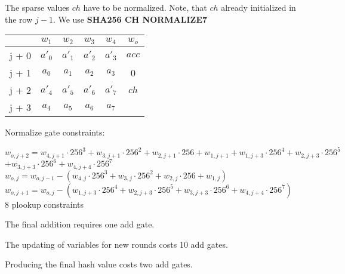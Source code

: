 The sparse values $ch$ have to be normalized.
Note, that $ch$ already initialized in the row $j - 1$.
We use \textbf{SHA256 CH NORMALIZE7}
\begin{center}
\begin{tabular}{ c|c|c|c|c|c } 
  & $w_1$ & $w_2$ & $w_3$ & $w_4$ & $w_o$\\ 
 \hline
j + 0 & $a'_0$ & $a'_1$ & $a'_2$ & $a'_3$ &  $acc$\\ 
j + 1 & $a_0$ & $ a_1$ & $a_2$ & $a_3$ & 0\\
j + 2 & $a'_4$ & $a'_5$ & $a'_6$ & $a'_7$ & $ch$ \\ 
j + 3 & $a_4$ & $ a_5$ & $a_6$ & $a_7$ &  \\
\end{tabular}
\end{center}

Normalize gate constraints:
\begin{center}
$w_{o,j+2} = w_{4,j+1} \cdot 256^3 + w_{3,j+1} \cdot 256^2 + w_{2,j+1} \cdot 256 + w_{1,j+1}
	+  w_{1,j+3} \cdot 256^4 + w_{2,j+3} \cdot 256^5$ \\
	$+ w_{3,j+3} \cdot 256^6 + w_{4,j+4} \cdot 256^7$ \\
$w_{o,j} = w_{o, j - 1} - (w_{4,j} \cdot 256^3 + w_{3,j} \cdot 256^2 + w_{2,j} \cdot 256 + w_{1,j})$ \\
$w_{o,j+1} = w_{o,j} - ( w_{1,j+3} \cdot 256^4 + w_{2,j+3} \cdot 256^5+ w_{3,j+3} \cdot 256^6 + w_{4,j+4} \cdot 256^7)$ \\
8 plookup constraints \\
\end{center}

The final addition requires one add gate.

The updating of variables for new rounds costs 10 add gates.

Producing the final hash value costs two add gates.
